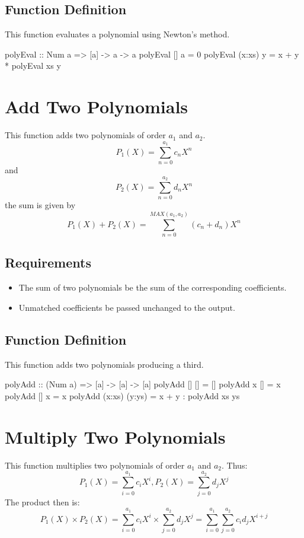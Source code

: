 \subsection{Function Definition}
This function evaluates a polynomial using Newton's method.
\begin{code}
polyEval :: Num a => [a] -> a -> a
polyEval [] a = 0
polyEval (x:xs) y = x + y * polyEval xs y
\end{code}

\section{Add Two Polynomials}
This function adds two polynomials of order $a_1$ and $a_2$.
\[
P_1(X) = \sum_{n = 0}^{a_1} c_nX^n
\]
and
\[
P_2(X) = \sum_{n = 0}^{a_2} d_nX^n
\]
the sum is given by
\[
P_1(X) + P_2(X)= \sum_{n = 0}^{MAX (a_1, a_2)} (c_n + d_n)X^n
\]

\subsection{Requirements}
\begin{itemize}
\item The sum of two polynomials  be the sum of the corresponding coefficients.
\item Unmatched coefficients  be passed unchanged to the output.
\end{itemize}

\subsection{Function Definition}
This function adds two polynomials producing a third.
\begin{code}
polyAdd :: (Num a) => [a] -> [a] -> [a]
polyAdd [] [] = []
polyAdd x []  = x
polyAdd [] x  = x
polyAdd (x:xs) (y:ys) = x + y :  polyAdd xs ys
\end{code}

\section{Multiply Two Polynomials}
This function multiplies two polynomials of order $a_1$ and $a_2$.  Thus:
\[
P_1(X) = \sum_{i = 0}^{a_1}c_iX^i, P_2(X) = \sum_{j = 0}^{a_2}d_jX^j
\]
The product then is:
\[
P_1(X) \times P_2(X) = \sum_{i = 0}^{a_1}c_iX^i \times \sum_{j = 0}^{a_2}d_jX^j = \sum_{i = 0}^{a_1} \sum_{j = 0}^{a_2} c_i d_j X^{i + j}
\]

